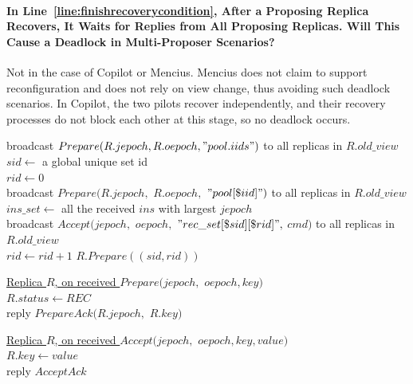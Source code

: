 \documentclass[twocolumn]{article}
\begin{document}
\paragraph{In Line~\ref{line:finishrecoverycondition}, After a Proposing Replica Recovers, It Waits for Replies from All Proposing Replicas. Will This Cause a Deadlock in Multi-Proposer Scenarios?}  
Not in the case of Copilot or Mencius. Mencius does not claim to support reconfiguration and does not rely on view change, thus avoiding such deadlock scenarios. In Copilot, the two pilots recover independently, and their recovery processes do not block each other at this stage, so no deadlock occurs.



\begin{algorithm}
    \caption{$Recovery()$}
    \label{alg:jetpack_recovery}
    \setcounter{AlgoLine}{56}
    broadcast $Prepare(R.jepoch, R.oepoch, "pool.iids")$ to all replicas in $R.old\_view$\\
    $sid\gets$ a global unique set id\\
    $rid\gets 0$\\
     {
        broadcast $Prepare(R.jepoch,$ $R.oepoch,$ $"pool[\$iid]")$ to all replicas in $R.old\_view$\\
         {
            $ins\_set\gets$ all the received $ins$ with largest $jepoch$\\
             {
                broadcast $Accept(jepoch,$ $oepoch,$ $"rec\_set[\$sid][\$rid]",$ $cmd)$ to all replicas in $R.old\_view$\\
                $rid\gets rid+1$
            }
        }
    }
    $R.Prepare((sid, rid))$\\

    \vskip 10pt

    \underline{Replica $R$, on received $Prepare(jepoch, $}
    \underline{$oepoch, key)$}\\
     {
        $R.status\gets REC$\\
        reply $PrepareAck(R.jepoch,$ $R.key)$\\
    }
    
    \vskip 10pt

    \underline{Replica $R$, on received $Accept(jepoch, $}
    \underline{$oepoch, key, value)$}\\
     {
        $R.key\gets value$\\
        reply $AcceptAck$\\
    }
\end{algorithm}
\end{document}
